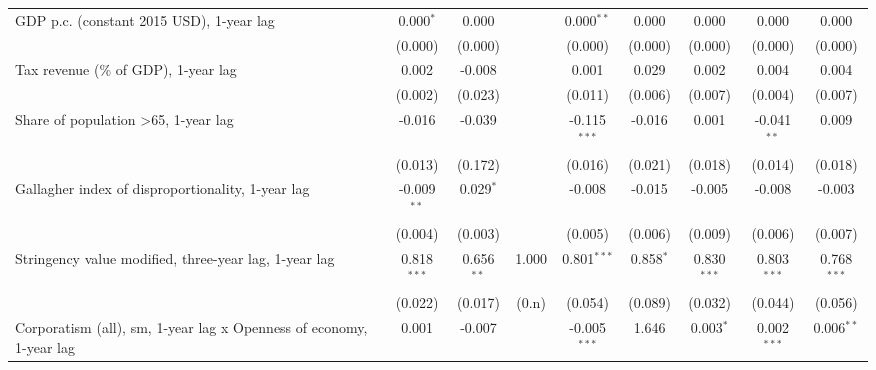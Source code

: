 \begin{table}[htbp]
\begin{tabular}{lcccccccc}
      GDP p.c. (constant 2015 USD), 1-year lag                            & 0.000$^{*}$   & 0.000                     &              & 0.000$^{**}$   & 0.000            & 0.000           & 0.000           & 0.000\\   
                                                                          & (0.000)       & (0.000)                   &              & (0.000)        & (0.000)          & (0.000)         & (0.000)         & (0.000)\\   
      Tax revenue (\% of GDP), 1-year lag                                 & 0.002         & -0.008                    &              & 0.001          & 0.029            & 0.002           & 0.004           & 0.004\\   
                                                                          & (0.002)       & (0.023)                   &              & (0.011)        & (0.006)          & (0.007)         & (0.004)         & (0.007)\\   
      Share of population >65, 1-year lag                                 & -0.016        & -0.039                    &              & -0.115$^{***}$ & -0.016           & 0.001           & -0.041$^{**}$   & 0.009\\   
                                                                          & (0.013)       & (0.172)                   &              & (0.016)        & (0.021)          & (0.018)         & (0.014)         & (0.018)\\   
      Gallagher index of disproportionality, 1-year lag                   & -0.009$^{**}$ & 0.029$^{*}$               &              & -0.008         & -0.015           & -0.005          & -0.008          & -0.003\\   
                                                                          & (0.004)       & (0.003)                   &              & (0.005)        & (0.006)          & (0.009)         & (0.006)         & (0.007)\\   
      Stringency value modified, three-year lag, 1-year lag               & 0.818$^{***}$ & 0.656$^{**}$              & 1.000        & 0.801$^{***}$  & 0.858$^{*}$      & 0.830$^{***}$   & 0.803$^{***}$   & 0.768$^{***}$\\   
                                                                          & (0.022)       & (0.017)                   & (0.n)        & (0.054)        & (0.089)          & (0.032)         & (0.044)         & (0.056)\\   
      Corporatism (all), sm, 1-year lag x Openness of economy, 1-year lag & 0.001         & -0.007                    &              & -0.005$^{***}$ & 1.646            & 0.003$^{*}$     & 0.002$^{***}$   & 0.006$^{**}$\\   

\end{tabular}
\end{table}
